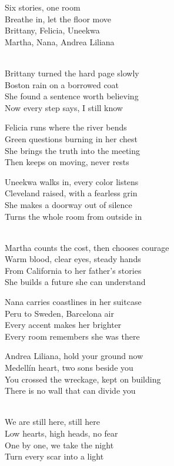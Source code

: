 \begin{lyrics}
Six stories, one room\\
Breathe in, let the floor move\\
Brittany, Felicia, Uneekwa\\
Martha, Nana, Andrea Liliana

\\
Brittany turned the hard page slowly\\
Boston rain on a borrowed coat\\
She found a sentence worth believing\\
Now every step says, I still know

Felicia runs where the river bends\\
Green questions burning in her chest\\
She brings the truth into the meeting\\
Then keeps on moving, never rests

Uneekwa walks in, every color listens\\
Cleveland raised, with a fearless grin\\
She makes a doorway out of silence\\
Turns the whole room from outside in

\\
Martha counts the cost, then chooses courage\\
Warm blood, clear eyes, steady hands\\
From California to her father’s stories\\
She builds a future she can understand

Nana carries coastlines in her suitcase\\
Peru to Sweden, Barcelona air\\
Every accent makes her brighter\\
Every room remembers she was there

Andrea Liliana, hold your ground now\\
Medellín heart, two sons beside you\\
You crossed the wreckage, kept on building\\
There is no wall that can divide you

\\
We are still here, still here\\
Low hearts, high heads, no fear\\
One by one, we take the night\\
Turn every scar into a light


\end{lyrics}
